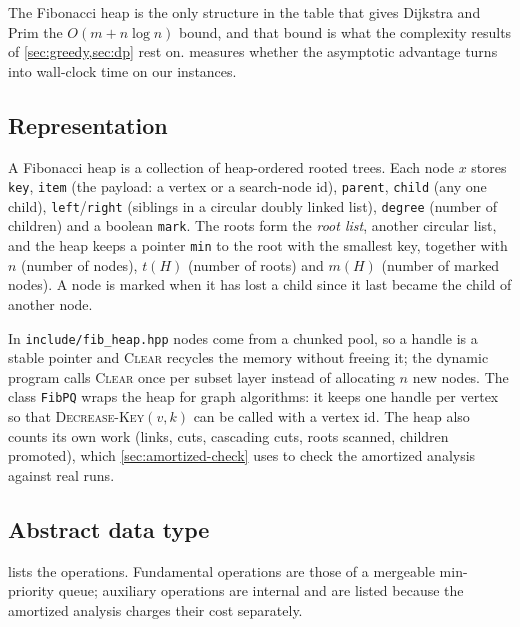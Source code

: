 The Fibonacci heap is the only structure in the table that gives Dijkstra and Prim the
\(O(m+n\log n)\) bound, and that bound is what the complexity results of \cref{sec:greedy,sec:dp} rest on.
 measures whether the asymptotic advantage turns into wall-clock time on our instances.

\subsection{Representation}
A Fibonacci heap is a collection of heap-ordered rooted trees. Each node \(x\) stores
\texttt{key}, \texttt{item} (the payload: a vertex or a search-node id), \texttt{parent}, \texttt{child} (any one
child), \texttt{left}/\texttt{right} (siblings in a circular doubly linked list), \texttt{degree} (number of
children) and a boolean \texttt{mark}. The roots form the \emph{root list}, another circular list, and the heap keeps a
pointer \texttt{min} to the root with the smallest key, together with \(n\) (number of nodes), \(t(H)\) (number of roots) and
\(m(H)\) (number of marked nodes). A node is marked when it has lost a child since it last became the child of another node.

In \texttt{include/fib\_heap.hpp} nodes come from a chunked pool, so a handle is a stable pointer and
\textsc{Clear} recycles the memory without freeing it; the dynamic program calls \textsc{Clear} once per subset layer
instead of allocating \(n\) new nodes. The class \texttt{FibPQ} wraps the heap for graph algorithms: it keeps one
handle per vertex so that \textsc{Decrease-Key}\((v,k)\) can be called with a vertex id. The heap also counts its
own work (links, cuts, cascading cuts, roots scanned, children promoted), which \cref{sec:amortized-check} uses to
check the amortized analysis against real runs.

\subsection{Abstract data type}
 lists the operations. Fundamental operations are those of a mergeable min-priority queue;
auxiliary operations are internal and are listed because the amortized analysis charges their cost separately.

